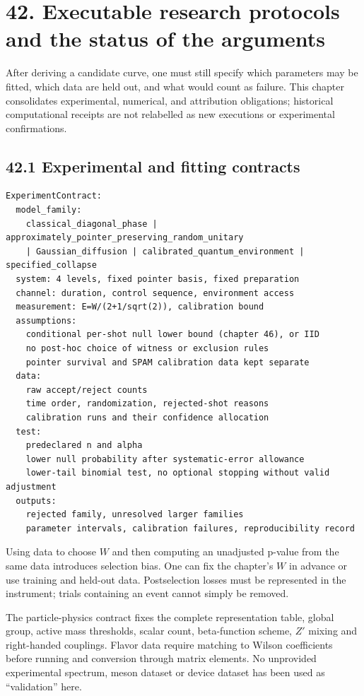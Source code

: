 \documentclass[
  11pt,
  oneside]{book}
\begin{document}
\chapter{42. Executable research protocols and the status of the
arguments}\label{ch-42}

After deriving a candidate curve, one must still specify which
parameters may be fitted, which data are held out, and what would count
as failure. This chapter consolidates experimental, numerical, and
attribution obligations; historical computational receipts are not
relabelled as new executions or experimental confirmations.

\section{42.1 Experimental and fitting contracts}

\begin{Verbatim}[breaklines,breakanywhere,fontsize=\scriptsize]
ExperimentContract:
  model_family:
    classical_diagonal_phase | approximately_pointer_preserving_random_unitary
    | Gaussian_diffusion | calibrated_quantum_environment | specified_collapse
  system: 4 levels, fixed pointer basis, fixed preparation
  channel: duration, control sequence, environment access
  measurement: E=W/(2+1/sqrt(2)), calibration bound
  assumptions:
    conditional per-shot null lower bound (chapter 46), or IID
    no post-hoc choice of witness or exclusion rules
    pointer survival and SPAM calibration data kept separate
  data:
    raw accept/reject counts
    time order, randomization, rejected-shot reasons
    calibration runs and their confidence allocation
  test:
    predeclared n and alpha
    lower null probability after systematic-error allowance
    lower-tail binomial test, no optional stopping without valid adjustment
  outputs:
    rejected family, unresolved larger families
    parameter intervals, calibration failures, reproducibility record
\end{Verbatim}

Using data to choose \(W\) and then computing an unadjusted p-value from
the same data introduces selection bias. One can fix the chapter's \(W\)
in advance or use training and held-out data. Postselection losses must
be represented in the instrument; trials containing an event cannot
simply be removed.

The particle-physics contract fixes the complete representation table,
global group, active mass thresholds, scalar count, beta-function
scheme, \(Z'\) mixing and right-handed couplings. Flavor data require
matching to Wilson coefficients before running and conversion through
matrix elements. No unprovided experimental spectrum, meson dataset or
device dataset has been used as ``validation'' here.
\end{document}
